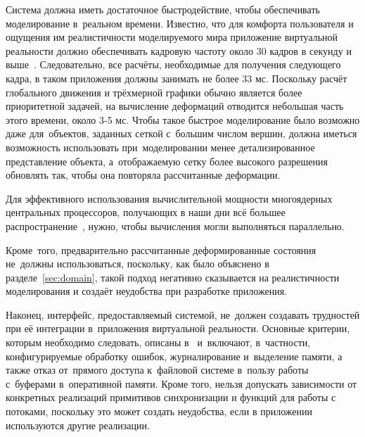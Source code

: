 \documentclass[a4paper, 14pt, titlepage]{extarticle}
\begin{document}
    Система должна иметь достаточное быстродействие, чтобы обеспечивать моделирование в~реальном
    времени. Известно, что для комфорта пользователя и ощущения им реалистичности моделируемого мира
    приложение виртуальной реальности должно обеспечивать кадровую частоту около 30 кадров в секунду %
    и выше~\cite{claypool-framerate}. Следовательно, все расчёты, необходимые для получения
    следующего кадра, в таком приложения должны занимать не более 33 мс. Поскольку расчёт глобального
    движения и трёхмерной графики обычно является более приоритетной задачей, на вычисление
    деформаций отводится небольшая часть этого времени, около 3-5 мс. Чтобы такое быстрое
    моделирование было возможно даже для~объектов, заданных сеткой с~большим числом вершин,
    должна иметься возможность использовать при~моделировании менее детализированное представление
    объекта, а~отображаемую сетку более высокого разрешения обновлять так, чтобы она повторяла
    рассчитанные деформации. %

    Для эффективного использования вычислительной мощности многоядерных центральных процессоров,
    получающих в наши дни всё большее распространение~\cite{steam-hardware}, нужно, чтобы вычисления могли
    выполняться параллельно.

    Кроме~того, предварительно рассчитанные деформированные состояния не~должны использоваться,
    поскольку, как было объяснено в разделе~\ref{sec:domain}, такой подход негативно сказывается на реалистичности
    моделирования и создаёт неудобства при разработке приложения.

    Наконец, интерфейс, предоставляемый системой, не~должен создавать трудностей при её интеграции
    в~приложения виртуальной реальности. Основные критерии, которым необходимо следовать,
    описаны в~\cite{gems-middleware} и~включают, в~частности, конфигурируемые обработку ошибок,
    журналирование и~выделение памяти, а также отказ от~прямого доступа к~файловой системе в~пользу
    работы с~буферами в~оперативной памяти. Кроме того, нельзя допускать зависимости от конкретных
    реализаций примитивов синхронизации и функций для работы с потоками, поскольку это может создать
    неудобства, если в приложении используются другие реализации.
\end{document}
